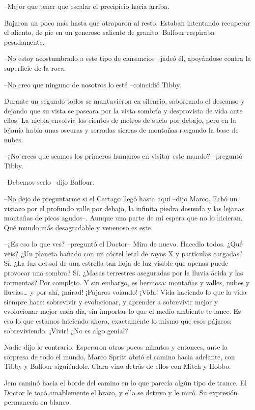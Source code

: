 {--Mejor que tener que escalar el precipicio hacia arriba.}

{Bajaron un poco más hasta que atraparon al resto. Estaban intentando
 recuperar el aliento, de pie en un generoso saliente de granito. Balfour
respiraba pesadamente.}

{--No estoy acostumbrado a este tipo de cansancios --jadeó él, apoyándose
contra la superficie de la roca.}

{--No creo que ninguno de nosotros lo esté --coincidió Tibby.}

{Durante un segundo todos se mantuvieron en silencio, saboreando el
 descanso y dejando que su vista se paseara por la vista sombría y
 desprovista de vida ante ellos. La niebla envolvía los cientos de metros
 de suelo por debajo, pero en la lejanía había unas oscuras y serradas
sierras de montañas rasgando la base de nubes.}

{--¿No crees que seamos los primeros humanos en visitar este mundo?
--preguntó Tibby.}

{--Debemos serlo --dijo Balfour.}

{--No dejo de preguntarme si el Cartago llegó hasta aquí --dijo Marco.
 Echó un vistazo por el profundo valle por debajo, la infinita piedra
 desnuda y las lejanas montañas de picos agudos--. Aunque una parte de mí
 espera que no lo hicieran. Qué mundo más desagradable y venenoso es
este.}

{--¿Es eso lo que ves? --preguntó el Doctor-- Mira de nuevo. Hacedlo
 todos. ¿Qué veis? ¿Un planeta bañado con un cóctel letal de rayos X y
 partículas cargadas? Sí. ¿La luz del sol de una estrella tan floja de
 luz visible que apenas puede provocar una sombra? Sí. ¿Masas terrestres
 aseguradas por la lluvia ácida y las tormentas? Por completo. Y sin
 embargo, es hermosa: montañas y valles, nubes y lluvias\ldots{} y por
 ahí, ¡mirad! ¡Pájaros volando! ¡Vida! Vida haciendo lo que la vida
 siempre hace: sobrevivir y evolucionar, y aprender a sobrevivir mejor y
 evolucionar mejor cada día, sin importar lo que el medio ambiente te
 lance. Es eso lo que estamos haciendo ahora, exactamente lo mismo que
esos pájaros: sobreviviendo. ¡Vivir! ¿No es algo genial?}

{Nadie dijo lo contrario. Esperaron otros pocos minutos y entonces, ante
 la sorpresa de todo el mundo, Marco Spritt abrió el camino hacia
 adelante, con Tibby y Balfour siguiéndole. Clara vino detrás de ellos
con Mitch y Hobbo.}

{Jem caminó hacia el borde del camino
 en lo que parecía algún tipo de trance. El Doctor le tocó amablemente el
brazo, y ella se detuvo y le miró. Su expresión permanecía en blanco.}

